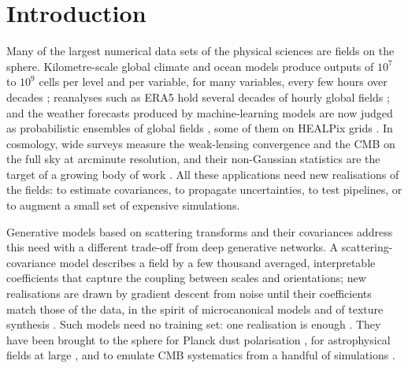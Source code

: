 \documentclass{aa}
\begin{document}

\maketitle

\section{Introduction}
\label{sec:intro}

Many of the largest numerical data sets of the physical sciences are fields on the sphere. Kilometre-scale global climate and ocean models produce outputs of $10^7$ to $10^9$ cells per level and per variable, for many variables, every few hours over decades \citep{stevens2019,eyring2016,hewitt2020}; reanalyses such as ERA5 hold several decades of hourly global fields \citep{hersbach2020}; and the weather forecasts produced by machine-learning models are now judged as probabilistic ensembles of global fields \citep{lam2023,bi2023,price2025,kochkov2024}, some of them on HEALPix grids \citep{karlbauer2024}. In cosmology, wide surveys measure the weak-lensing convergence and the CMB on the full sky at arcminute resolution, and their non-Gaussian statistics are the target of a growing body of work \citep{kratochvil2010,kratochvil2012,petri2013,ajani2023,gatti2024}. All these applications need new realisations of the fields: to estimate covariances, to propagate uncertainties, to test pipelines, or to augment a small set of expensive simulations.

Generative models based on scattering transforms \citep{mallat2012,bruna2013} and their covariances \citep{morel2022,cheng2024} address this need with a different trade-off from deep generative networks. A scattering-covariance model describes a field by a few thousand averaged, interpretable coefficients that capture the coupling between scales and orientations; new realisations are drawn by gradient descent from noise until their coefficients match those of the data, in the spirit of microcanonical models \citep{bruna2019} and of texture synthesis \citep{portilla2000,gatys2015}. Such models need no training set: one realisation is enough \citep{allys2019,allys2020,cheng2020,cheng2021,jeffrey2022,regaldo2021}. They have been brought to the sphere for Planck dust polarisation \citep{delouis2022}, for astrophysical fields at large \citep{mcewen2022,mousset2024}, and to emulate CMB systematics from a handful of simulations \citep{campeti2025}.
\end{document}
